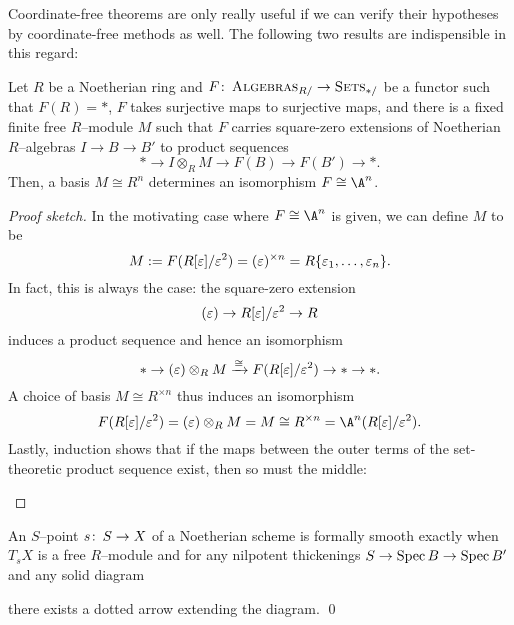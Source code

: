 Coordinate-free theorems are only really useful if we can verify their hypotheses by coordinate-free methods as well.  The following two results are indispensible in this regard:
\begin{theorem}\label{DetectingFormalVarieties}
Let \(R\) be a Noetherian ring and \(F\colon\thinspace \normalfont\textsc{Algebras}_{R/} \to \normalfont\textsc{Sets}_{*/}\) be a functor such that \(F(R) = *\), \(F\) takes surjective maps to surjective maps, and there is a fixed finite free \(R\)--module \(M\) such that \(F\) carries square-zero extensions of Noetherian \(R\)--algebras \(I \to B \to B'\) to product sequences \[* \to I \otimes_R M \to F(B) \to F(B') \to *.\]  Then, a basis \(M \cong R^n\) determines an isomorphism \(F \cong \A^n\).
\end{theorem}
\begin{proof}[Proof sketch]
In the motivating case where \(F \cong \A^n\) is given, we can define \(M\) to be \[M := F(R[\varepsilon] / \varepsilon^2) = (\varepsilon)^{\times n} = R\{\varepsilon_1, \ldots, \varepsilon_n\}.\]  In fact, this is always the case: the square-zero extension \[(\varepsilon) \to R[\varepsilon] / \varepsilon^2 \to R\] induces a product sequence and hence an isomorphism \[* \to (\varepsilon) \otimes_R M \xrightarrow{\cong} F(R[\varepsilon] / \varepsilon^2) \to * \to *.\]  A choice of basis \(M \cong R^{\times n}\) thus induces an isomorphism \[F(R[\eps] / \eps^2) = (\eps) \otimes_R M = M \cong R^{\times n} = \A^n(R[\eps] / \eps^2).\]  Lastly, induction shows that if the maps between the outer terms of the set-theoretic product sequence exist, then so must the middle:
\begin{center}
\end{center}
\vspace{-\baselineskip}
\end{proof}

\begin{corollary}
An \(S\)--point \(s\colon\thinspace S \to X\) of a Noetherian scheme is formally smooth exactly when \(T_s X\) is a free \(R\)--module and for any nilpotent thickenings \(S \to \operatorname{Spec} B \to \operatorname{Spec} B'\) and any solid diagram
\begin{center}
\end{center}
there exists a dotted arrow extending the diagram. \qed
\end{corollary}

